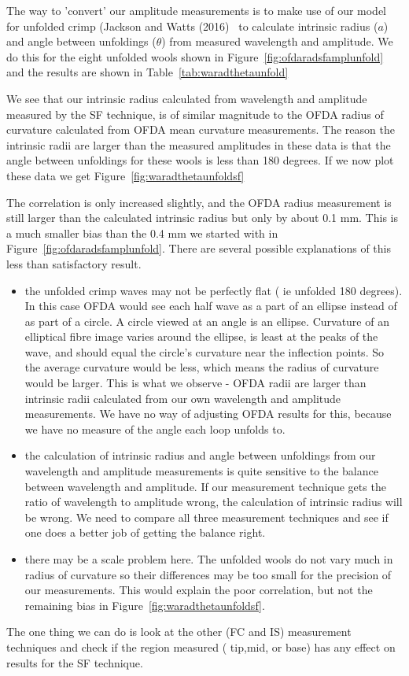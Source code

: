 \documentclass[titlepage,10pt]{article}  %
\begin{document}
The way to 'convert' our amplitude measurements is to make use of our model for unfolded crimp (Jackson and Watts (2016)~\cite{jack:16} to calculate intrinsic radius ($a$) and angle between unfoldings ($\theta$) from measured wavelength and amplitude.  We do this for the eight unfolded wools shown in Figure~\ref{fig:ofdaradsfamplunfold} and the results are shown in Table~\ref{tab:waradthetaunfold}

We see that our intrinsic radius calculated from wavelength and amplitude measured by the SF technique, is of similar magnitude to the OFDA radius of curvature calculated from OFDA mean curvature measurements.  The reason the intrinsic radii are larger than the measured amplitudes in these data is that the angle between unfoldings for these wools is less than 180 degrees. If we now plot these data we get Figure~\ref{fig:waradthetaunfoldsf}

 The correlation is only increased slightly, and the OFDA radius measurement is still larger than the calculated intrinsic radius but only by about 0.1 mm. This is a much smaller bias than the 0.4 mm we started with in Figure~\ref{fig:ofdaradsfamplunfold}.
There are several possible explanations of this less than satisfactory result.
\begin{itemize}
\item  the unfolded crimp waves may not be perfectly flat ( ie unfolded 180 degrees). In this case OFDA would see each half wave as a part of an ellipse instead of as part of a circle. A circle viewed at an angle is an ellipse. Curvature of an elliptical fibre image varies around the ellipse, is least at the peaks of the wave, and should equal the circle's curvature near the inflection points. So the average curvature would be less, which means the radius of curvature would be larger. This is what we observe - OFDA radii are larger than intrinsic radii calculated from our own wavelength and amplitude measurements. We have no way of adjusting OFDA results for this, because we have no measure of the angle each loop unfolds to.
\item the calculation of intrinsic radius and angle between unfoldings from our wavelength and amplitude measurements is quite sensitive to the balance between wavelength and amplitude.  If our measurement technique gets the ratio of wavelength to amplitude wrong, the calculation of intrinsic radius will be wrong. We need to compare all three measurement techniques and see if one does a better job of getting the balance right.
\item there may be a scale problem here. The unfolded wools do not vary much in radius of curvature so their differences may be too small for the precision of our measurements. This would explain the poor correlation, but not the remaining bias in Figure~\ref{fig:waradthetaunfoldsf}.
\end{itemize}
The one thing we can do is look at the other (FC and IS) measurement techniques and check if the region measured ( tip,mid, or base) has any effect on results for the SF technique. 
\end{document}

